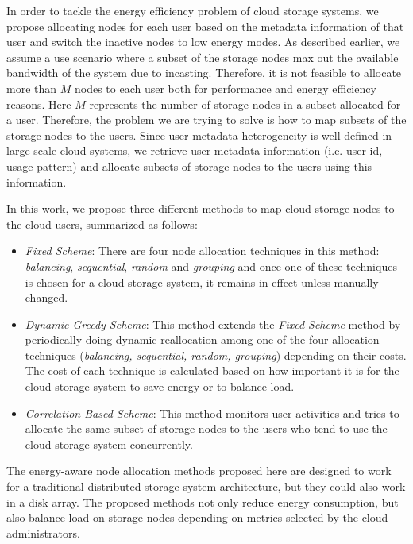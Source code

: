 In order to tackle the energy efficiency problem of cloud storage systems, we propose
allocating nodes for each user based on the metadata information of that user
and switch the inactive nodes to low energy modes. As described earlier, we assume
a use scenario where a subset of the storage nodes max out the
available bandwidth of the system due to incasting. Therefore, it is not feasible to allocate more
than $M$ nodes to each user both for performance and energy efficiency reasons. Here $M$
represents the number of storage nodes in a subset allocated for a user. Therefore,
the problem we are trying to solve is how to map subsets of the storage nodes to the users.
Since user metadata heterogeneity is well-defined in large-scale cloud systems, we
retrieve user metadata information (i.e. user id, usage pattern) and
allocate subsets of storage nodes to the users using this information.

In this work, we propose three different methods to map cloud storage nodes to the
cloud users, summarized as follows:

\begin{itemize}
\item \textit{Fixed Scheme}: There
are four node allocation techniques in this method: \textit{balancing}, \textit{sequential},
\textit{random} and \textit{grouping} and once one of these techniques is chosen for a
cloud storage system, it remains in effect unless manually changed.
\item \textit{Dynamic Greedy Scheme}: This method
extends the \textit{Fixed Scheme} method by periodically doing dynamic reallocation
among one of the four
allocation techniques (\textit{balancing, sequential, random, grouping}) depending
on their costs. The cost of each technique is calculated based on how important it is
for the cloud storage system to save energy or to balance load.
\item \textit{Correlation-Based Scheme}: This method
monitors user activities and tries to allocate the same subset of storage nodes to the
users who tend to use the cloud storage system concurrently.
\end{itemize}

The energy-aware node allocation methods proposed here are designed to work for a traditional
distributed storage system architecture, but they could also work in a disk array. The
proposed methods not only reduce energy consumption, but also balance load on storage
nodes depending on metrics selected by the cloud administrators.

